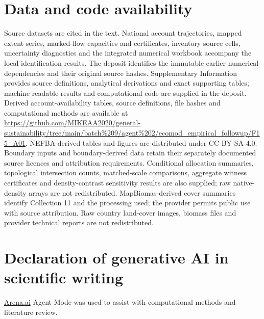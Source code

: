 \documentclass[11pt,a4paper]{article}
\begin{document}
\section*{Data and code availability}
Source datasets are cited in the text. National account trajectories, mapped extent series, marked-flow capacities and certificates, inventory source cells, uncertainty diagnostics and the integrated numerical workbook accompany the local identification results. The deposit identifies the immutable earlier numerical dependencies and their original source hashes. Supplementary Information provides source definitions, analytical derivations and exact supporting tables; machine-readable results and computational code are supplied in the deposit. Derived account-availability tables, source definitions, file hashes and computational methods are available at \url{https://github.com/MIKEAA2020/general-sustainability/tree/main/batch%209/agent%202/ecomod_empirical_followup/F15_A01}. NEFBA-derived tables and figures are distributed under CC BY-SA 4.0. Boundary inputs and boundary-derived data retain their separately documented source licences and attribution requirements. Conditional allocation summaries, topological intersection counts, matched-scale comparisons, aggregate witness certificates and density-contrast sensitivity results are also supplied; raw native-density arrays are not redistributed. MapBiomas-derived cover summaries identify Collection 11 and the processing used; the provider permits public use with source attribution. Raw country land-cover images, biomass files and provider technical reports are not redistributed.

\section*{Declaration of generative AI in scientific writing}
\href{http://Arena.ai}{Arena.ai} Agent Mode was used to assist with computational methods and literature review.
\end{document}
